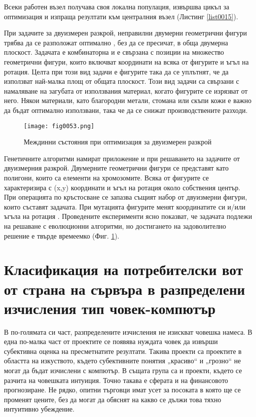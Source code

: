 Всеки работен възел получава своя локална популация, извършва цикъл за оптимизация и изпраща резултати към централния възел (Листинг \ref{list0015}).

При задачите за двуизмерен разкрой, неправилни двумерни геометрични фигури трябва да се разположат оптимално , без да се пресичат, в обща двумерна плоскост. Задачата е комбинаторна и е свързана с позиции на множество геометрични фигури, които включват координати на всяка от фигурите и ъгъл на ротация. Целта при този вид задачи е фигурите така да се уплътнят, че да използват най-малка площ от общата плоскост. Този вид задачи са свързани с намаляване на загубата от използвания материал, когато фигурите се изрязват от него. Някои материали, като благородни метали, стомана или скъпи кожи е важно да бъдат оптимално използвани, така че да се снижат производствените разходи. 

\begin{figure}[H]
  \centering
  \texttt{[image: fig0053.png]}
  \caption{Междинни състояния при оптимизация за двуизмерен разкрой}
\label{fig0053}
\end{figure}

Генетичните алгоритми намират приложение и при решаването на задачите от двуизмерния разкрой. Двумерните геометрични фигури се представят като полигони, които са елементи на хромозомите. Всяка от фигурите се характеризира с (x,y) координати и ъгъл на ротация около собствения център. При операцията по кръстосване се запазва същият набор от двуизмерни фигури, които съставят задачата. При мутацията фигурите менят координатите си и/или ъгъла на ротация \cite{Balabanov-03}. Проведените експерименти ясно показват, че задачата подлежи на решаване с еволюционни алгоритми, но достигането на задоволително решение е твърде времеемко (Фиг. \ref{fig0053}).

\section{Класификация на потребителски вот от страна на сървъра в разпределени изчисления тип човек-компютър}

В по-голямата си част, разпределените изчисления не изискват човешка намеса. В една по-малка част от проектите се появява нуждата човек да извърши субективна оценка на пресметнатите резултати. Такива проекти са проектите в областта на изкуството, където субективните понятия „красиво“ и „грозно“ не могат да бъдат изчислени с компютър. В същата група са и проекти, където се разчита на човешката интуиция. Точно такава е сферата и на финансовото прогнозиране. Не рядко, опитни търговци имат усет за посоката в която ще се променят цените, без да могат да обяснят на какво се дължи това тяхно интуитивно убеждение. 


